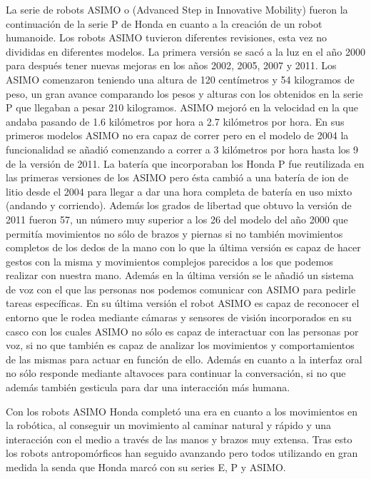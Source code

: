 La serie de robots ASIMO o (Advanced Step in Innovative Mobility) fueron la continuación de la serie P de Honda en cuanto a la creación de un robot humanoide. Los robots ASIMO tuvieron diferentes revisiones, esta vez no divididas en diferentes modelos. La primera versión se sacó a la luz en el año 2000 para después tener nuevas mejoras en los años 2002, 2005, 2007 y 2011. Los ASIMO comenzaron teniendo una altura de 120 centímetros y 54 kilogramos de peso, un gran avance comparando los pesos y alturas con los obtenidos en la serie P que llegaban a pesar 210 kilogramos. ASIMO mejoró en la velocidad en la que andaba pasando de 1.6 kilómetros por hora a 2.7 kilómetros por hora. En sus primeros modelos ASIMO no era capaz de correr pero en el modelo de 2004 la funcionalidad se añadió comenzando a correr a 3 kilómetros por hora hasta los 9 de la versión de 2011. La batería que incorporaban los Honda P fue reutilizada en las primeras versiones de los ASIMO pero ésta cambió a una batería de ion de litio desde el 2004 para llegar a dar una hora completa de batería en uso mixto (andando y corriendo). Además los grados de libertad que obtuvo la versión de 2011 fueron 57, un número muy superior a los 26 del modelo del año 2000 que permitía movimientos no sólo de brazos y piernas si no también movimientos completos de los dedos de la mano con lo que la última versión es capaz de hacer gestos con la misma y movimientos complejos parecidos a los que podemos realizar con nuestra mano. Además en la última versión se le añadió un sistema de voz con el que las personas nos podemos comunicar con ASIMO para pedirle tareas específicas. En su última versión el robot ASIMO es capaz de reconocer el entorno que le rodea mediante cámaras y sensores de visión incorporados en su casco con los cuales ASIMO no sólo es capaz de interactuar con las personas por voz, si no que también es capaz de analizar los movimientos y comportamientos de las mismas para actuar en función de ello. Además en cuanto a la interfaz oral no sólo responde mediante altavoces para continuar la conversación, si no que además también gesticula para dar una interacción más humana.

Con los robots ASIMO Honda completó una era en cuanto a los movimientos en la robótica, al conseguir un movimiento al caminar natural y rápido y una interacción con el medio a través de las manos y brazos muy extensa. Tras esto los robots antropomórficos han seguido avanzando pero todos utilizando en gran medida la senda que Honda marcó con su series E, P y ASIMO.
